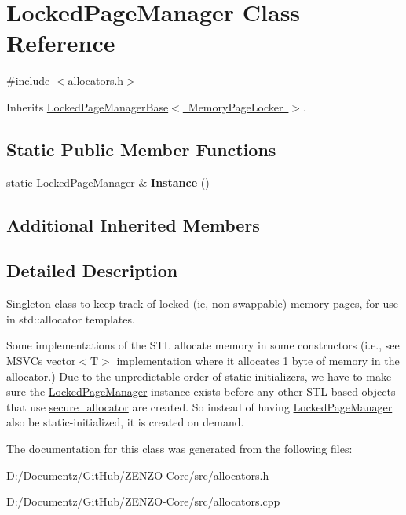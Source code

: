 \hypertarget{class_locked_page_manager}{}\section{Locked\+Page\+Manager Class Reference}
\label{class_locked_page_manager}


{\ttfamily \#include $<$allocators.\+h$>$}



Inherits \mbox{\hyperlink{class_locked_page_manager_base}{Locked\+Page\+Manager\+Base$<$ Memory\+Page\+Locker $>$}}.

\subsection*{Static Public Member Functions}
\begin{DoxyCompactItemize}
\item 
\mbox{\label{class_locked_page_manager_ac9b1d42d240dba4714a35fff970b6dde}} 
static \mbox{\hyperlink{class_locked_page_manager}{Locked\+Page\+Manager}} \& {\bfseries Instance} ()
\end{DoxyCompactItemize}
\subsection*{Additional Inherited Members}


\subsection{Detailed Description}
Singleton class to keep track of locked (ie, non-\/swappable) memory pages, for use in std\+::allocator templates.

Some implementations of the S\+TL allocate memory in some constructors (i.\+e., see M\+S\+VC\textquotesingle{}s vector$<$\+T$>$ implementation where it allocates 1 byte of memory in the allocator.) Due to the unpredictable order of static initializers, we have to make sure the \mbox{\hyperlink{class_locked_page_manager}{Locked\+Page\+Manager}} instance exists before any other S\+T\+L-\/based objects that use \mbox{\hyperlink{structsecure__allocator}{secure\+\_\+allocator}} are created. So instead of having \mbox{\hyperlink{class_locked_page_manager}{Locked\+Page\+Manager}} also be static-\/initialized, it is created on demand. 

The documentation for this class was generated from the following files\+:\begin{DoxyCompactItemize}
\item 
D\+:/\+Documentz/\+Git\+Hub/\+Z\+E\+N\+Z\+O-\/\+Core/src/allocators.\+h\item 
D\+:/\+Documentz/\+Git\+Hub/\+Z\+E\+N\+Z\+O-\/\+Core/src/allocators.\+cpp\end{DoxyCompactItemize}
